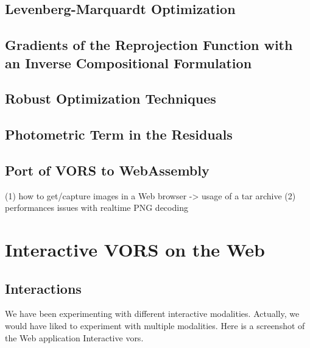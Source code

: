 \subsection{Levenberg-Marquardt Optimization}%
\label{sub:lm-optimization}

\subsection{Gradients of the Reprojection Function with an Inverse Compositional Formulation}%
\label{sub:gradients-inverse-compostional}

\subsection{Robust Optimization Techniques}%
\label{sub:robust-optim}

\subsection{Photometric Term in the Residuals}%
\label{sub:photometric-residual}

\subsection{Port of VORS to WebAssembly}%
\label{sub:vors-port-wasm}

(1) how to get/capture images in a Web browser -> usage of a tar archive
(2) performances issues with realtime PNG decoding


\section{Interactive VORS on the Web}%
\label{sec:interactive-vors}


\subsection{Interactions}%
\label{sub:interactions}

We have been experimenting with different interactive modalities.
Actually, we would have liked to experiment with multiple modalities.
Here is a screenshot of the Web application Interactive vors.

